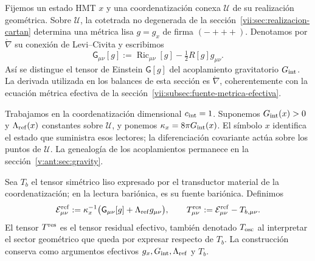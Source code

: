 Fijemos un estado HMT \(x\) y una coordenatización conexa \(\mathcal U\) de su
realización geométrica. Sobre \(\mathcal U\), la cotetrada no degenerada
de la sección~\ref{vii:sec:realizacion-cartan} determina una métrica lisa
\(g=g_x\) de firma \((-+++)\). Denotamos por
\(\mathring\nabla\) su conexión de Levi--Civita y escribimos
\[
 \mathsf G_{\mu\nu}[g]
 :=\operatorname{Ric}_{\mu\nu}[g]-\tfrac12R[g]g_{\mu\nu}.
\]
Así se distingue el tensor de Einstein \(\mathsf G[g]\) del acoplamiento
gravitatorio \(G_{\rm int}\). La derivada utilizada en los balances
de esta sección es \(\mathring\nabla\), coherentemente con la ecuación
métrica efectiva de la sección~\ref{vii:subsec:fuente-metrica-efectiva}.

Trabajamos en la coordenatización dimensional \(c_{\rm int}=1\). Suponemos
\(G_{\rm int}(x)>0\) y \(\Lambda_{\rm ref}(x)\) constantes sobre
\(\mathcal U\), y ponemos \(\kappa_x=8\pi G_{\rm int}(x)\).
El símbolo \(x\) identifica el estado que suministra esos lectores;
la diferenciación covariante actúa sobre los puntos de \(\mathcal U\).
La genealogía de los acoplamientos permanece en la
sección~\ref{v:ant:sec:gravity}.

Sea \(T_b\) el tensor simétrico liso expresado por el transductor material
de la coordenatización; en la lectura bariónica, es su fuente bariónica. Definimos
\begin{equation}
 \mathcal E^{\rm ref}_{\mu\nu}
 :=\kappa_x^{-1}\bigl(\mathsf G_{\mu\nu}[g]
                            +\Lambda_{\rm ref}g_{\mu\nu}\bigr),
 \qquad
 T^{\rm res}_{\mu\nu}:=\mathcal E^{\rm ref}_{\mu\nu}-T_{b,\mu\nu}.
 \label{vii:eq:residual-definicion}
\end{equation}
El tensor \(T^{\rm res}\) es el tensor residual efectivo, también
denotado \(T_{\rm osc}\) al interpretar el sector geométrico que queda
por expresar respecto de \(T_b\). La construcción conserva como
argumentos efectivos \(g_x,G_{\rm int},\Lambda_{\rm ref}\) y \(T_b\).

